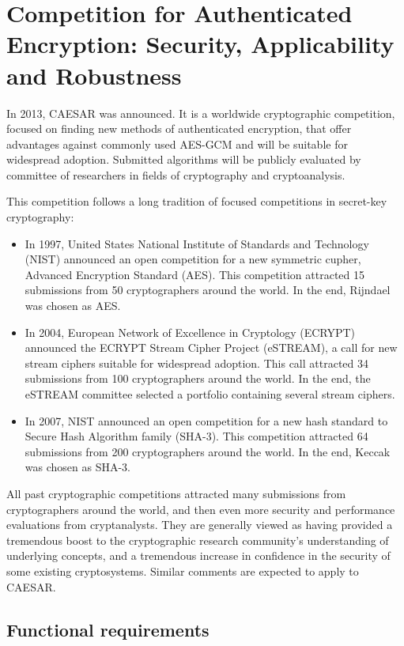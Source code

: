 \chapter{Competition for Authenticated Encryption: Security, Applicability and Robustness}

In 2013, CAESAR was announced. It is a worldwide cryptographic competition, focused on finding new methods of authenticated encryption, that offer advantages against commonly used AES-GCM and will be suitable for widespread adoption. Submitted algorithms will be publicly evaluated by committee of researchers in fields of cryptography and cryptoanalysis.

This competition follows a long tradition of focused competitions in secret-key cryptography:

\begin{itemize}
  \item In 1997, United States National Institute of Standards and Technology (NIST) announced an open competition for a new symmetric cupher, Advanced Encryption Standard (AES). This competition attracted 15 submissions from 50 cryptographers around the world. In the end, Rijndael was chosen as AES.
  \item In 2004, European Network of Excellence in Cryptology (ECRYPT) announced the ECRYPT Stream Cipher Project (eSTREAM), a call for new stream ciphers suitable for widespread adoption. This call attracted 34 submissions from 100 cryptographers around the world. In the end, the eSTREAM committee selected a portfolio containing several stream ciphers.
  \item In 2007, NIST announced an open competition for a new hash standard to Secure Hash Algorithm family (SHA-3). This competition attracted 64 submissions from 200 cryptographers around the world. In the end, Keccak was chosen as SHA-3.
\end{itemize}

All past cryptographic competitions attracted many submissions from cryptographers around the world, and then even more security and performance evaluations from cryptanalysts. They are generally viewed as having provided a tremendous boost to the cryptographic research community's understanding of underlying concepts, and a tremendous increase in confidence in the security of some existing cryptosystems. Similar comments are expected to apply to CAESAR. \cite{crypto-competitions}


\section{Functional requirements}

